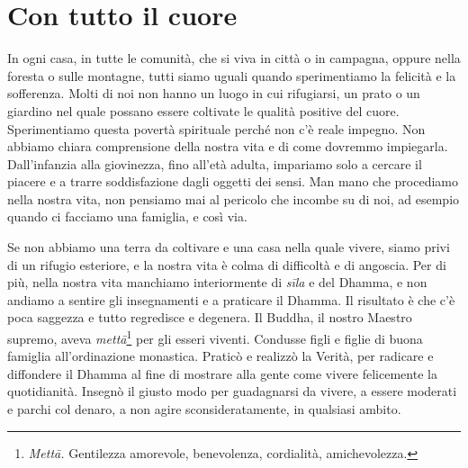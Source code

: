 \chapter{Con tutto il cuore}

In ogni casa, in tutte le comunità, che si viva in città o in campagna,
oppure nella foresta o sulle montagne, tutti siamo uguali quando
sperimentiamo la felicità e la sofferenza. Molti di noi non hanno un
luogo in cui rifugiarsi, un prato o un giardino nel quale possano essere
coltivate le qualità positive del cuore. Sperimentiamo questa povertà
spirituale perché non c'è reale impegno. Non abbiamo chiara comprensione
della nostra vita e di come dovremmo impiegarla. Dall'infanzia alla
giovinezza, fino all'età adulta, impariamo solo a cercare il piacere e a
trarre soddisfazione dagli oggetti dei sensi. Man mano che procediamo
nella nostra vita, non pensiamo mai al pericolo che incombe su di noi,
ad esempio quando ci facciamo una famiglia, e così via.

Se non abbiamo una terra da coltivare e una casa nella quale vivere,
siamo privi di un rifugio esteriore, e la nostra vita è colma di
difficoltà e di angoscia. Per di più, nella nostra vita manchiamo
interiormente di \emph{sīla} e del Dhamma, e non andiamo a sentire gli
insegnamenti e a praticare il Dhamma. Il risultato è che c'è poca
saggezza e tutto regredisce e degenera. Il Buddha, il nostro Maestro
supremo, aveva \emph{mettā}\footnote{\emph{Mettā.} Gentilezza amorevole,
  benevolenza, cordialità, amichevolezza.} per gli esseri viventi.
Condusse figli e figlie di buona famiglia all'ordinazione monastica.
Praticò e realizzò la Verità, per radicare e diffondere il Dhamma al
fine di mostrare alla gente come vivere felicemente la quotidianità.
Insegnò il giusto modo per guadagnarsi da vivere, a essere moderati e
parchi col denaro, a non agire sconsideratamente, in qualsiasi ambito.

